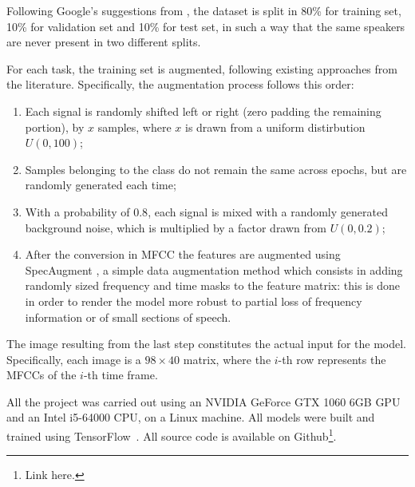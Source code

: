 Following Google's suggestions from \cite{speechdataset2018warden}, the dataset is split in 80\% for training set, 10\% for validation set and 10\% for test set, in such a way that the same speakers are never present in two different splits. 

For each task, the training set is augmented, following existing approaches from the literature. Specifically, the augmentation process follows this order:
\begin{enumerate}
	\item Each signal is randomly shifted left or right (zero padding the remaining portion), by $x$ samples, where $x$ is drawn from a uniform distirbution $U(0,100)$;
	\item Samples belonging to the  class do not remain the same across epochs, but are randomly generated each time;
	\item With a probability of $0.8$, each signal is mixed with a randomly generated background noise, which is multiplied by a factor drawn from $U(0,0.2)$; 
	\item After the conversion in MFCC the features are augmented using SpecAugment \cite{park2019specaugment}, a simple data augmentation method which consists in adding randomly sized frequency and time masks to the feature matrix: this is done in order to render the model more robust to partial loss of frequency information or of small sections of speech.
\end{enumerate}

The image resulting from the last step constitutes the actual input for the model. Specifically, each image is a $98 \times 40$ matrix, where the $i$-th row represents the MFCCs of the $i$-th time frame. 


All the project was carried out using an NVIDIA GeForce GTX 1060 6GB GPU and an Intel i5-64000 CPU, on a Linux machine. All models were built and trained using TensorFlow~\cite{Abadi2016TensorFlowAS}. All source code is available on Github\footnote{Link here.}. %

